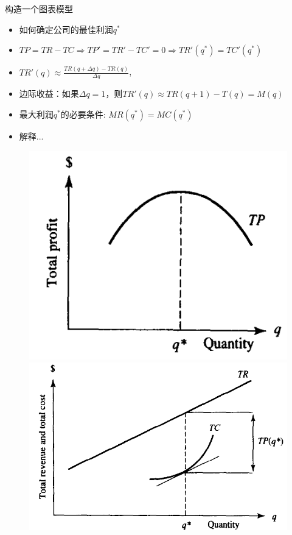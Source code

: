 \documentclass[mathserif, table]{beamer}
\begin{document}
\begin{frame}{构造一个图表模型}
  \begin{itemize}
  \item 如何确定公司的最佳利润$q^*$
  \item $TP = TR - TC \Rightarrow TP' = TR' - TC' = 0 \Rightarrow TR'(q^*) = TC'(q^*)$
  \item $TR'(q) \approx \frac{TR(q+\Delta q)-TR(q)}{\Delta q}$,
  \item 边际收益：如果$\Delta q = 1$，则$TR'(q) \approx TR(q+1)-T(q)=M(q)$
  \item 最大利润$q^*$的必要条件: $MR(q^*) = MC(q^*)$
  \item 解释...
  \end{itemize}
  
  \begin{figure}
    \includegraphics[height=.35\textheight]{profit.png}
    \includegraphics[height=.35\textheight]{totalcr.png}

\end{figure}
\end{frame}
\end{document}
